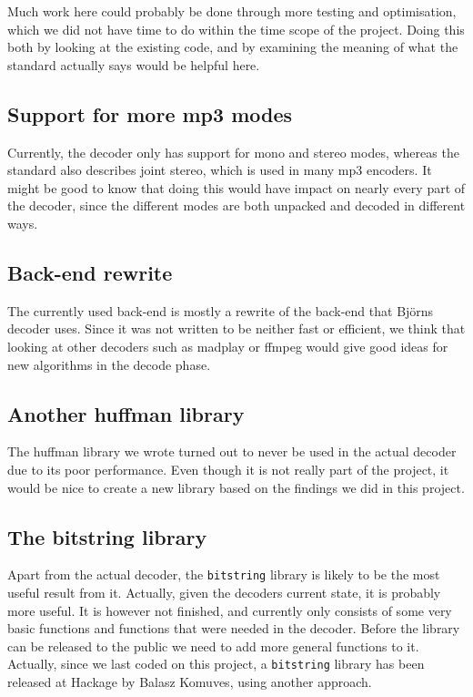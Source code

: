 \documentclass[a4paper,12pt]{article}
\begin{document}
        Much work here could probably be done through more testing and
        optimisation, which we did not have time to do within the time scope of
        the project. Doing this both by looking at the existing code, and by
        examining the meaning of what the standard actually says would be
        helpful here.

    \subsection{Support for more mp3 modes}
        Currently, the decoder only has support for mono and stereo modes,
        whereas the standard also describes joint stereo, which is used in many
        mp3 encoders. It might be good to know that doing this would have impact
        on nearly every part of the decoder, since the different modes are both
        unpacked and decoded in different ways.

    \subsection{Back-end rewrite}
        The currently used back-end is mostly a rewrite of the back-end that
        Björns decoder uses. Since it was not written to be neither fast or
        efficient, we think that looking at other decoders such as madplay or
        ffmpeg would give good ideas for new algorithms in the decode phase.

    \subsection{Another huffman library}
        The huffman library we wrote turned out to never be used in the actual
        decoder due to its poor performance. Even though it is not really part
        of the project, it would be nice to create a new library based on the
        findings we did in this project.

    \subsection{The bitstring library}
        Apart from the actual decoder, the \texttt{bitstring} library is likely
        to be the most useful result from it. Actually, given the decoders
        current state, it is probably more useful. It is however not finished,
        and currently only consists of some very basic functions and functions
        that were needed in the decoder. Before the library can be released to
        the public we need to add more general functions to it. Actually, since
        we last coded on this project, a \texttt{bitstring} library has been
        released at Hackage by Balasz Komuves\cite{bitstring}, using another
        approach.
\end{document}
